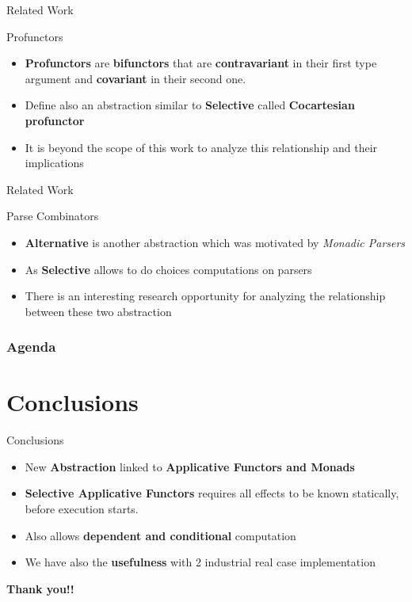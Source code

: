 \documentclass{beamer}
\begin{document}
 \begin{frame}[fragile]{Related Work}
  \begin{block}{Profunctors}
    \begin{itemize}
    \item \textbf{Profunctors} are \textbf{bifunctors} that are \textbf{contravariant} in their first type
      argument and \textbf{covariant} in their second one.
    \item Define also an abstraction similar to \textbf{Selective} called \textbf{Cocartesian profunctor}
    \item It is beyond the scope of this work to analyze this relationship and
      their implications
    \end{itemize}
  \end{block}
\end{frame}

\begin{frame}[fragile]{Related Work} 
  \begin{block}{Parse Combinators}
    \begin{itemize}
    \item \textbf{Alternative} is another abstraction which was motivated by
      \textit{Monadic Parsers}
    \item As \textbf{Selective} allows to do choices computations on parsers
    \item There is an interesting research opportunity for analyzing the
      relationship between these two abstraction
    \end{itemize}
  \end{block}


\end{frame}

\begin{frame}
  \frametitle{Agenda}
  \section{Conclusions}
  \tableofcontents[currentsection]
\end{frame}
\begin{frame}{Conclusions}
  \begin{itemize}
    \item New \textbf{Abstraction} linked to \textbf{Applicative Functors and
        Monads}
    \item \textbf{Selective Applicative Functors} requires all effects to be
      known statically, before execution starts.
    \item Also allows \textbf{dependent and conditional} computation
    \item We have also the \textbf{usefulness} with 2 industrial real case implementation 
  \end{itemize}
\end{frame}

\begin{frame}
  \begin{center}
    \textbf{\huge{Thank you!!}}
    \end{center}
\end{frame}
 
\end{document}
